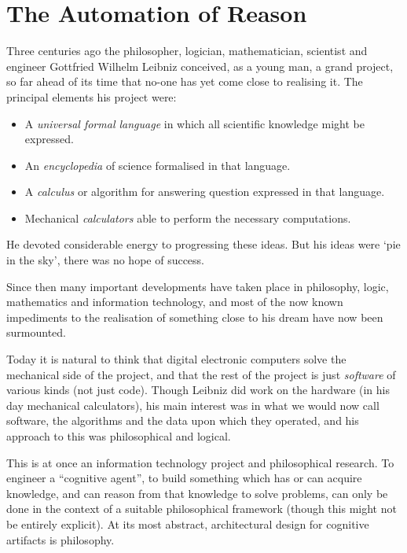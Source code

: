 \section{The Automation of Reason}

Three centuries ago the philosopher, logician, mathematician,
scientist and engineer Gottfried Wilhelm Leibniz conceived, as a young
man, a grand project, so far ahead of its time that no-one has yet
come close to realising it.
The principal elements his project were:
\begin{itemize}
\item A {\it universal formal language} in which all scientific
  knowledge might be expressed.
\item An {\it encyclopedia} of science formalised in that language.
\item A {\it calculus} or algorithm for answering question expressed
  in that language.
\item Mechanical {\it calculators} able to perform the necessary computations.
\end{itemize}

He devoted considerable energy to progressing these ideas.
But his ideas were `pie in the sky', there was no hope of success.

Since then many important developments have taken place in philosophy,
logic, mathematics and information technology, and most of the now known
impediments to the realisation of something close to his dream have
now been surmounted.

Today it is natural to think that digital electronic computers solve the mechanical side
of the project, and that the rest of the project is just {\it software} of
various kinds (not just code).
Though Leibniz did work on the hardware (in his day mechanical
calculators), his main interest was in what we would now call software,
the algorithms and the data upon which they operated, and his approach
to this was philosophical and logical.
 
This is at once an information technology project and philosophical research.
To engineer a ``cognitive agent'', to build something which has or can
acquire knowledge, and can reason from that knowledge to solve
problems, can only be done in the context of a suitable philosophical
framework (though this might not be entirely explicit).
At its most abstract, architectural design for cognitive artifacts is
philosophy.

